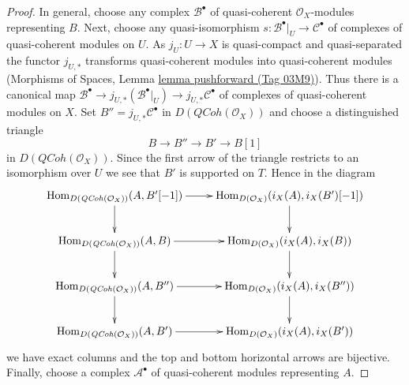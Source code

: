\documentclass{amsart}
\theoremstyle{plain}
\theoremstyle{definition}
\theoremstyle{remark}
\numberwithin{equation}{subsection}
\def\Hom{\mathop{\mathrm{Hom}}\nolimits}
\def\QCoh{\mathit{QCoh}}
\begin{document}
\begin{proof}
\medskip\noindent
In general, choose any complex $\mathcal{B}^\bullet$ of quasi-coherent
$\mathcal{O}_X$-modules representing $B$. Next, choose any quasi-isomorphism
$s : \mathcal{B}^\bullet|_U \to \mathcal{C}^\bullet$ of complexes of
quasi-coherent modules on $U$. As $j_U : U \to X$ is
quasi-compact and quasi-separated the functor $j_{U, *}$ transforms
quasi-coherent modules into quasi-coherent modules
(Morphisms of Spaces, Lemma \href{https://stacks.math.columbia.edu/tag/03M9}{lemma pushforward (Tag 03M9)}).
Thus there is a canonical map
$\mathcal{B}^\bullet \to j_{U, *}(\mathcal{B}^\bullet|_U) \to
j_{U, *}\mathcal{C}^\bullet$
of complexes of quasi-coherent modules on $X$.
Set $B'' = j_{U, *}\mathcal{C}^\bullet$ in $D(\QCoh(\mathcal{O}_X))$
and choose a distinguished triangle
$$
B \to B'' \to B' \to B[1]
$$
in $D(\QCoh(\mathcal{O}_X))$. Since the first arrow of the triangle
restricts to an isomorphism over $U$ we see that $B'$ is supported on $T$.
Hence in the diagram
$$
\xymatrix{
\Hom_{D(\QCoh(\mathcal{O}_X))}(A, B'[-1]) \ar[r] \ar[d] &
\Hom_{D(\mathcal{O}_X)}(i_X(A), i_X(B')[-1]) \ar[d] \\
\Hom_{D(\QCoh(\mathcal{O}_X))}(A, B) \ar[r] \ar[d] &
\Hom_{D(\mathcal{O}_X)}(i_X(A), i_X(B)) \ar[d] \\
\Hom_{D(\QCoh(\mathcal{O}_X))}(A, B'') \ar[r] \ar[d] &
\Hom_{D(\mathcal{O}_X)}(i_X(A), i_X(B'')) \ar[d] \\
\Hom_{D(\QCoh(\mathcal{O}_X))}(A, B') \ar[r] &
\Hom_{D(\mathcal{O}_X)}(i_X(A), i_X(B'))
}
$$
we have exact columns and the top and bottom horizontal arrows are
bijective. Finally, choose a complex $\mathcal{A}^\bullet$
of quasi-coherent modules representing $A$.


\end{proof}
\end{document}
